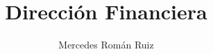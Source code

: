 \documentclass[10pt, a4paper, twoside, twocolumn]{book}
\title{Dirección Financiera}
\author{Mercedes Román Ruiz}
\date{}
\begin{document}
\sloppy 
\setlength{\parindent}{15pt} %
\setlength{\parskip}{5pt} %
\renewcommand\thesection{\arabic{section}}
\renewcommand{\baselinestretch}{1.5}
\renewcommand{\listtablename}{Índice de tablas} %
\renewcommand{\tablename}{Tabla} %
\renewcommand{\baselinestretch}{1.5}

\fancyhead{}
\fancyfoot{}
\pagestyle{fancy}
\chead[\rightmark]{\leftmark}

\fancyfoot[LE,RO]{\thepage}



%

%



\end{document}
